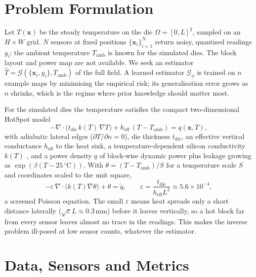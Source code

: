 \documentclass[journal]{IEEEtran}
\begin{document}
\section{Problem Formulation}\label{sec:problem}

Let $T(\mathbf{x})$ be the steady temperature on the die $\Omega=[0,L]^2$, sampled on an $H\times W$ grid.
$N$ sensors at fixed positions $\{\mathbf{x}_i\}_{i=1}^N$ return noisy, quantised readings $y_i$; the ambient temperature $T_\mathrm{amb}$ is known for the simulated dies.
The block layout and power map are not available.
We seek an estimator $\hat T=\mathcal G(\{\mathbf{x}_i,y_i\},T_\mathrm{amb})$ of the full field.
A learned estimator $\mathcal G_\phi$ is trained on $n$ example maps by minimising the empirical risk; its generalisation error grows as $n$ shrinks, which is the regime where prior knowledge should matter most.

For the simulated dies the temperature satisfies the compact two-dimensional HotSpot model \cite{huang2006hotspot}
\begin{equation}\label{eq:pde}
-\nabla\cdot\big(t_\mathrm{die}\,k(T)\,\nabla T\big) + h_\mathrm{eff}\,(T-T_\mathrm{amb}) = q(\mathbf{x},T),
\end{equation}
with adiabatic lateral edges ($\partial T/\partial n=0$), die thickness $t_\mathrm{die}$, an effective vertical conductance $h_\mathrm{eff}$ to the heat sink, a temperature-dependent silicon conductivity $k(T)$ \cite{glassbrenner1964silicon}, and a power density $q$ of block-wise dynamic power plus leakage growing as $\exp(\beta(T-25\,^\circ\mathrm{C}))$.
With $\theta=(T-T_\mathrm{amb})/S$ for a temperature scale $S$ and coordinates scaled to the unit square,
\begin{equation}\label{eq:nondim}
-\varepsilon\,\nabla\cdot\big(k(T)\nabla\theta\big) + \theta = \tilde q, \qquad \varepsilon=\frac{t_\mathrm{die}}{h_\mathrm{eff}L^2}\approx 5.6\times10^{-4},
\end{equation}
a screened Poisson equation.
The small $\varepsilon$ means heat spreads only a short distance laterally ($\sqrt\varepsilon L\approx0.3$\,mm) before it leaves vertically, so a hot block far from every sensor leaves almost no trace in the readings.
This makes the inverse problem ill-posed at low sensor counts, whatever the estimator.

\section{Data, Sensors and Metrics}\label{sec:data}
\end{document}
